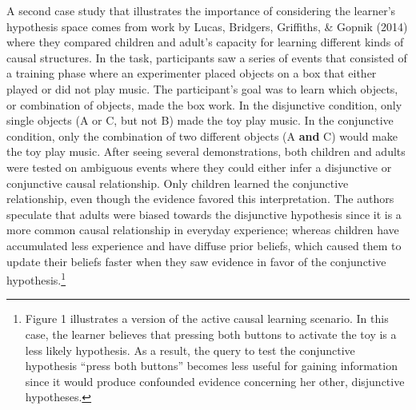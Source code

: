 \documentclass[oneside]{report}
\begin{document}
A second case study that illustrates the importance of considering the
learner's hypothesis space comes from work by Lucas, Bridgers,
Griffiths, \& Gopnik (2014) where they compared children and adult's
capacity for learning different kinds of causal structures. In the task,
participants saw a series of events that consisted of a training phase
where an experimenter placed objects on a box that either played or did
not play music. The participant's goal was to learn which objects, or
combination of objects, made the box work. In the disjunctive condition,
only single objects (A or C, but not B) made the toy play music. In the
conjunctive condition, only the combination of two different objects (A
\textbf{and} C) would make the toy play music. After seeing several
demonstrations, both children and adults were tested on ambiguous events
where they could either infer a disjunctive or conjunctive causal
relationship. Only children learned the conjunctive relationship, even
though the evidence favored this interpretation. The authors speculate
that adults were biased towards the disjunctive hypothesis since it is a
more common causal relationship in everyday experience; whereas children
have accumulated less experience and have diffuse prior beliefs, which
caused them to update their beliefs faster when they saw evidence in
favor of the conjunctive hypothesis.\footnote{Figure 1 illustrates a
  version of the active causal learning scenario. In this case, the
  learner believes that pressing both buttons to activate the toy is a
  less likely hypothesis. As a result, the query to test the conjunctive
  hypothesis ``press both buttons'' becomes less useful for gaining
  information since it would produce confounded evidence concerning her
  other, disjunctive hypotheses.}
\end{document}
